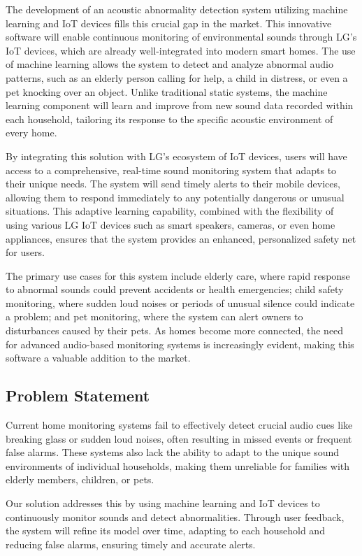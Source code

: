 \documentclass[conference]{IEEEtran}
\begin{document}
The development of an acoustic abnormality detection system utilizing machine learning and IoT devices fills this crucial gap in the market. This innovative software will enable continuous monitoring of environmental sounds through LG's IoT devices, which are already well-integrated into modern smart homes. The use of machine learning allows the system to detect and analyze abnormal audio patterns, such as an elderly person calling for help, a child in distress, or even a pet knocking over an object. Unlike traditional static systems, the machine learning component will learn and improve from new sound data recorded within each household, tailoring its response to the specific acoustic environment of every home.

By integrating this solution with LG's ecosystem of IoT devices, users will have access to a comprehensive, real-time sound monitoring system that adapts to their unique needs. The system will send timely alerts to their mobile devices, allowing them to respond immediately to any potentially dangerous or unusual situations. This adaptive learning capability, combined with the flexibility of using various LG IoT devices such as smart speakers, cameras, or even home appliances, ensures that the system provides an enhanced, personalized safety net for users.

The primary use cases for this system include elderly care, where rapid response to abnormal sounds could prevent accidents or health emergencies; child safety monitoring, where sudden loud noises or periods of unusual silence could indicate a problem; and pet monitoring, where the system can alert owners to disturbances caused by their pets. As homes become more connected, the need for advanced audio-based monitoring systems is increasingly evident, making this software a valuable addition to the market.

\subsection{Problem Statement}
Current home monitoring systems fail to effectively detect crucial audio cues like breaking glass or sudden loud noises, often resulting in missed events or frequent false alarms. These systems also lack the ability to adapt to the unique sound environments of individual households, making them unreliable for families with elderly members, children, or pets.

Our solution addresses this by using machine learning and IoT devices to continuously monitor sounds and detect abnormalities. Through user feedback, the system will refine its model over time, adapting to each household and reducing false alarms, ensuring timely and accurate alerts.
\end{document}
